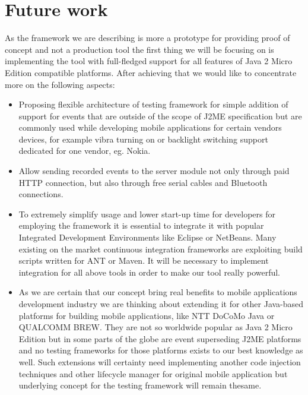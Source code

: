 \documentclass[a4paper,10pt,oneside,final]{dweiss-technote}
\begin{document}

\section{Future work}

As the framework we are describing is more a prototype for providing proof of concept and not a
production tool the first thing we will be focusing on is implementing the tool with full-fledged
support for all features of Java 2 Micro Edition compatible platforms. After achieving that we would
like to concentrate more on the following aspects:
%
\begin{itemize}
    \item Proposing flexible architecture of testing framework for simple addition of support for
    events that are outside of the scope of J2ME specification but are commonly used while
    developing mobile applications for certain vendors devices, for example vibra turning on or
    backlight switching support dedicated for one vendor, eg. Nokia.
    
	\item Allow sending recorded events to the server module not only through paid HTTP connection,
	but also through free serial cables and Bluetooth connections.
    
	\item To extremely simplify usage and lower start-up time for developers for employing the
	framework it is essential to integrate it with popular Integrated Development Environments like
	Eclipse or NetBeans. Many existing on the market continuous integration frameworks are
	exploiting build scripts written for ANT or Maven. It will be necessary to implement integration
	for all above tools in order to make our tool really powerful.
    
	\item As we are certain that our concept bring real benefits to mobile applications development
	industry we are thinking about extending it for other Java-based platforms for building mobile
	applications, like NTT DoCoMo Java or QUALCOMM BREW. They are not so worldwide popular as Java 2
	Micro Edition but in some parts of the globe are event superseding J2ME platforms and no testing
	frameworks for those platforms exists to our best knowledge as well. Such extensions will
	certainty need implementing another code injection techniques and other lifecycle manager for
	original mobile application but underlying concept for the testing framework will remain
	thesame.
\end{itemize}
\end{document}
